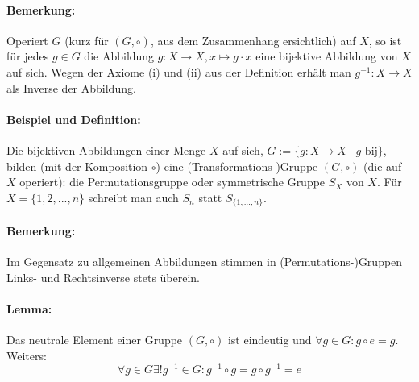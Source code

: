 \documentclass[12pt,a4paper,parskip=half-,DIV=15]{scrreprt}
\begin{document}
\paragraph{Bemerkung:} Operiert $G$ (kurz für $(G,\circ )$, aus dem Zusammenhang ersichtlich) auf $X$, so ist für jedes $g\in G$ die Abbildung $g:X\to X, x\mapsto g\cdot x$ eine bijektive Abbildung von $X$ auf sich. Wegen der Axiome (i) und (ii) aus der Definition erhält man $g^{-1}: X\to X$ als Inverse der Abbildung.
\paragraph{Beispiel und Definition:} Die bijektiven Abbildungen einer Menge $X$ auf sich, $G:= \{g:X\to X\mid g \text{ bij}\}$, bilden (mit der Komposition $\circ$) eine (Transformations-)Gruppe $(G,\circ )$ (die auf $X$ operiert): die Permutationsgruppe oder symmetrische Gruppe $S_X$ von $X$. Für $X=\{1,2,...,n\}$ schreibt man auch $S_n$ statt $S_{\{1,...,n\}}$.
\paragraph{Bemerkung:} Im Gegensatz zu allgemeinen Abbildungen stimmen in (Permutations-)Gruppen Links- und Rechtsinverse stets überein.
\paragraph{Lemma:} Das neutrale Element einer Gruppe $(G,\circ )$ ist eindeutig und $\forall g\in G: g\circ e = g$. Weiters: \begin{equation*}\forall g\in G \exists ! g^{-1} \in G: g^{-1}\circ g = g \circ g^{-1} = e\end{equation*}
\end{document}
